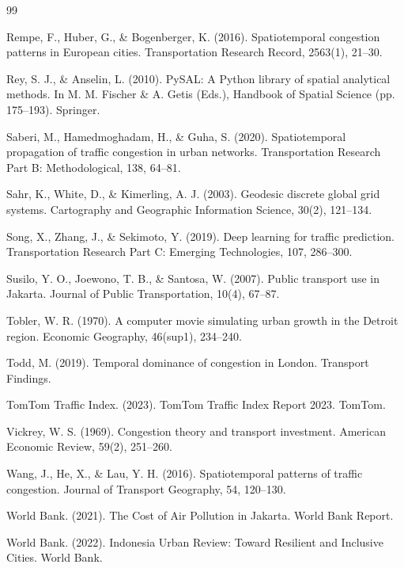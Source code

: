 \documentclass[12pt,a4paper]{article}
\begin{document}
\begin{thebibliography}{99}
\item Rempe, F., Huber, G., \& Bogenberger, K. (2016). Spatiotemporal congestion patterns in European cities. Transportation Research Record, 2563(1), 21--30.

\item Rey, S. J., \& Anselin, L. (2010). PySAL: A Python library of spatial analytical methods. In M. M. Fischer \& A. Getis (Eds.), Handbook of Spatial Science (pp. 175--193). Springer.

\item Saberi, M., Hamedmoghadam, H., \& Guha, S. (2020). Spatiotemporal propagation of traffic congestion in urban networks. Transportation Research Part B: Methodological, 138, 64--81.

\item Sahr, K., White, D., \& Kimerling, A. J. (2003). Geodesic discrete global grid systems. Cartography and Geographic Information Science, 30(2), 121--134.

\item Song, X., Zhang, J., \& Sekimoto, Y. (2019). Deep learning for traffic prediction. Transportation Research Part C: Emerging Technologies, 107, 286--300.

\item Susilo, Y. O., Joewono, T. B., \& Santosa, W. (2007). Public transport use in Jakarta. Journal of Public Transportation, 10(4), 67--87.

\item Tobler, W. R. (1970). A computer movie simulating urban growth in the Detroit region. Economic Geography, 46(sup1), 234--240.

\item Todd, M. (2019). Temporal dominance of congestion in London. Transport Findings.

\item TomTom Traffic Index. (2023). TomTom Traffic Index Report 2023. TomTom.

\item Vickrey, W. S. (1969). Congestion theory and transport investment. American Economic Review, 59(2), 251--260.

\item Wang, J., He, X., \& Lau, Y. H. (2016). Spatiotemporal patterns of traffic congestion. Journal of Transport Geography, 54, 120--130.

\item World Bank. (2021). The Cost of Air Pollution in Jakarta. World Bank Report.

\item World Bank. (2022). Indonesia Urban Review: Toward Resilient and Inclusive Cities. World Bank.


\end{thebibliography}
\end{document}
